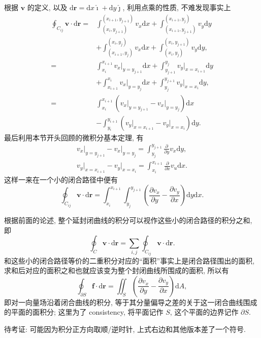 根据 $\boldsymbol{v}$ 的定义, 以及
$\mathrm{d}\boldsymbol{r}=\mathrm{d}x\hat{\imath}+\mathrm{d}y\hat{\jmath}$,
利用点乘的性质, 不难发现事实上 \[
\begin{aligned}
\oint_{C_{ij}}\boldsymbol{v}\cdot\mathrm{d}\boldsymbol{r}=&\int_{(x_i,y_{j+1})
}^{(x_{i+1},y_{j+1})}v_x\mathrm{d}x+\int_{(x_{i+1},y_{j+1})
}^{(x_{i+1},y_j)}v_y\mathrm{d}y\\
&+\int_{(x_{i+1},y_j)
}^{(x_i,y_j)}v_x\mathrm{d}x+\int_{(x_i,y_j)
}^{(x_i,y_{j+1})}v_y\mathrm{d}y,\\
=&\int_{x_i
}^{x_{i+1}}v_x\Big|_{y=y_{j+1}}\mathrm{d}x+\int_{y_{j+1}
}^{y_j}v_y\Big|_{x=x_{i+1}}\mathrm{d}y\\
&+\int_{x_{i+1}
}^{x_i}v_x\Big|_{y=y_{j}}\mathrm{d}x+\int_{y_j
}^{y_{j+1}}v_y\Big|_{x=x_{i}}\mathrm{d}y,\\
=&\int_{x_i}^{x_{i+1}}\left(v_x\Big|_{y=y_{j+1}}-v_x\Big|_{y=y_j}\right)\mathrm{d}x\\&-\int_{y_i}^{y_{i+1}}\left(v_y\Big|_{x=x_{i+1}}-v_y\Big|_{x=x_i}\right)\mathrm{d}y.
\end{aligned}
\] 最后利用本节开头回顾的微积分基本定理, 有 \[
\begin{aligned}
v_x\Big|_{y=y_{j+1}}-v_x\Big|_{y=y_j}=\int_{y_j}^{y_{j+1}}\frac{\partial}{\partial y}v_x\mathrm{d}y,\\
v_y\Big|_{x=x_{i+1}}-v_y\Big|_{x=x_i}=\int_{x_i}^{x_{i+1}}\frac{\partial}{\partial x}v_u\mathrm{d}x.
\end{aligned}
\] 这样一来在一个小的闭合路径中便有 \[
\oint_{C_{ij}}\boldsymbol{v}\cdot\mathrm{d}\boldsymbol{r}=\int_{x_i}^{x_{i+1}}\int_{y_j}^{y_{j+1}}\left(\frac{\partial v_x}{\partial y}-\frac{\partial v_y}{\partial x}\right)\mathrm{d}y\mathrm{d}x.
\]

根据前面的论述, 整个延封闭曲线的积分可以视作这些小的闭合路径的积分之和,
即 \[
\oint_C\boldsymbol{v}\cdot\mathrm{d}\boldsymbol{r}=\sum_{i,j}\oint_{C_{ij}}\boldsymbol{v}\cdot\mathrm{d}\boldsymbol{r}.
\]
和这些小的闭合路径等价的二重积分对应的``面积''事实上是闭合路径围出的面积,
求和后对应的面积之和也就应该变为整个封闭曲线所围成的面积, 所以有 \[
\boxed{\oint_{\partial S}\boldsymbol{f}\cdot\mathrm{d}\boldsymbol{r}=\iint_S\left(\frac{\partial v_x}{\partial y}-\frac{\partial v_y}{\partial x}\right)\mathrm{d}A},
\] 即对一向量场沿着闭合曲线的积分,
等于其分量偏导之差的关于这一闭合曲线围成的平面的面积分; 这里为了
consistency, 将平面记作 $S$, 这个平面的边界记作 $\partial S$.

\begin{newquote}
待考证: 可能因为积分正方向取顺/逆时针, 上式右边和其他版本差了一个符号.
\end{newquote}

